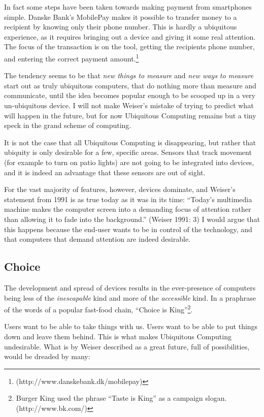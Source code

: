 In fact some steps have been taken towards making payment from smartphones simple. Danske Bank's MobilePay makes it possible to transfer money
to a recipient by knowing only their phone number. This is hardly a ubiquitous experience, as it requires bringing out a device and giving it
some real attention. The focus of the transaction is on the tool, getting the recipients phone number, and entering the correct payment
amount.\footnote{(http://www.danskebank.dk/mobilepay)}

The tendency seems to be that \emph{new things to measure} and \emph{new ways to measure} start out as truly ubiquitous computers, that do
nothing more than measure and communicate, until the idea becomes popular enough to be scooped up in a very un-ubiquitous device. I will
not make Weiser's mistake of trying to predict what will happen in the future, but for now Ubiquitous Computing remains but a tiny speck in the
grand scheme of computing.

It is not the case that all Ubiquitous Computing is disappearing, but rather
that ubiquity is only desirable for a few, specific areas. Sensors that track movement (for example to turn on patio lights) are not going to be integrated
into devices, and it is indeed an advantage that these sensors are out of sight.

For the vast majority of features, however, devices dominate, and Weiser's statement from 1991 is as true today as it was in its
time: ``Today's multimedia machine makes the computer screen into a demanding focus of attention rather than allowing it to fade into the
background.'' (Weiser 1991: 3) I would argue that this happens because the end-user wants to be in control of the technology, and that
computers that demand attention are indeed desirable.

\subsection*{Choice}

The development and spread of devices results in the ever-presence of computers being less of the \emph{inescapable} kind and more of the \emph{accessible}
kind. In a praphrase of the words of a popular fast-food chain, ``Choice is King''\footnote{Burger King used the phrase ``Taste is King'' as a campaign slogan. (http://www.bk.com/)}.

Users want to be able to take things with us. Users want to be able to put things down and leave them behind. This is what makes Ubiquitous Computing undesirable.
What is by Weiser described as a great future, full of possibilities, would be dreaded by many:


